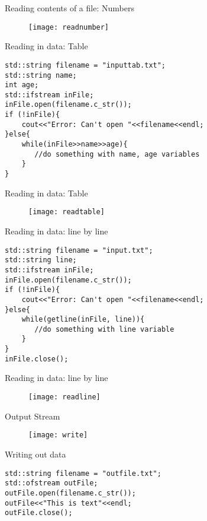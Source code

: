 \documentclass[xcolor={dvipsnames}]{beamer}
\begin{document}
\begin{frame}{Reading contents of a file: Numbers}
	\begin{figure}
		\texttt{[image: readnumber]}
	\end{figure}
\end{frame}

\begin{frame}[fragile]{Reading in data: Table}
\begin{verbatim}
std::string filename = "inputtab.txt";
std::string name;
int age;
std::ifstream inFile;
inFile.open(filename.c_str());
if (!inFile){
    cout<<"Error: Can't open "<<filename<<endl;
}else{
    while(inFile>>name>>age){
       //do something with name, age variables
    }
}
\end{verbatim}
\end{frame}

\begin{frame}{Reading in data: Table}
	\begin{figure}
		\texttt{[image: readtable]}
	\end{figure}
\end{frame}

\begin{frame}[fragile]{Reading in data: line by line}
\begin{verbatim}
std::string filename = "input.txt";
std::string line;
std::ifstream inFile;
inFile.open(filename.c_str());
if (!inFile){
    cout<<"Error: Can't open "<<filename<<endl;
}else{
    while(getline(inFile, line)){
       //do something with line variable
    }
}
inFile.close();
\end{verbatim}
\end{frame}

\begin{frame}{Reading in data: line by line}
	\begin{figure}
		\texttt{[image: readline]}
	\end{figure}
\end{frame}

\begin{frame}{Output Stream}
	\begin{figure}
		\texttt{[image: write]}
	\end{figure}
\end{frame}

\begin{frame}[fragile]{Writing out data}
\begin{verbatim}
std::string filename = "outfile.txt";
std::ofstream outFile;
outFile.open(filename.c_str());
outFile<<"This is text"<<endl;
outFile.close();
\end{verbatim}
\end{frame}
\end{document}
